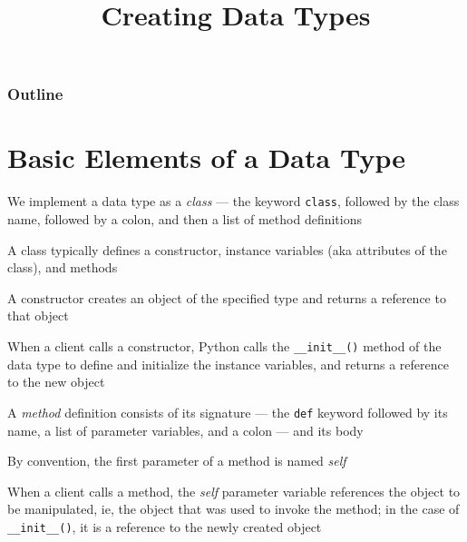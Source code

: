 \documentclass[8pt,a4paper,compress,handout]{beamer}
\title{Creating Data Types}
\date{}
\begin{document}
\begin{frame}
\vfill
\titlepage
\end{frame}

\begin{frame}
\frametitle{Outline}
\tableofcontents
\end{frame}

\section{Basic Elements of a Data Type}
\begin{frame}[fragile]
We implement a data type as a \emph{class} --- the keyword \lstinline{class}, followed by the class name, followed by a colon, and then a list of method definitions

\bigskip

A class typically defines a constructor, instance variables (aka attributes of the class), and methods

\bigskip

A constructor creates an object of the specified type and returns a reference to that object

\bigskip

When a client calls a constructor, Python calls the \lstinline{__init__()} method of the data type to define and initialize the instance variables, and returns a reference to the new object

\bigskip

A \emph{method} definition consists of its signature --- the \lstinline{def} keyword followed by its name, a list of parameter variables, and a colon --- and its body

\bigskip

By convention, the first parameter of a method is named \emph{self}

\bigskip

When a client calls a method, the \emph{self} parameter variable references the object to be manipulated, ie, the object that was used to invoke the method; in the case of \lstinline{__init__()}, it is a reference to the newly created object
\end{frame}
\end{document}
